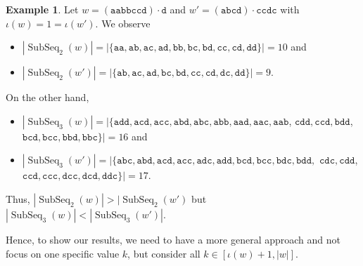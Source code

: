 \documentclass[10pt,a4paper]{amsart}
\def\ta{\mathtt{a}}
\def\tb{\mathtt{b}}
\def\tc{\mathtt{c}}
\def\td{\mathtt{d}}
\DeclareMathOperator{\alphabet}{alph}
\DeclareMathOperator\ScatFact{SubSeq}
\DeclareMathOperator\SubWords{SubSeq}
\DeclareMathOperator{\nextAlphPos}{next}
\theoremstyle{plain}
\theoremstyle{definition}
\newtheorem{example}{Example}
\begin{document}
\else
\begin{example}\label{counterexample}
    Let $w = \mathtt{(aabbccd) \cdot d}$ and $w' = \mathtt{(abcd) \cdot ccdc}$ with $\iota(w) = 1 = \iota(w')$. We observe
    \begin{itemize}
    \item $|\ScatFact_2(w)| = |\{\ta\ta, \ta\tb, \ta\tc, \ta\td, \tb\tb, \tb\tc, \tb\td, \tc\tc, \tc\td, \td\td\}| = 10$
    and
    \item $|\ScatFact_2(w')| = |\{\ta\tb, \ta\tc, \ta\td, \tb\tc, \tb\td, \tc\tc, \tc\td, \td\tc, \td\td\}| = 9$.
    \end{itemize}
    On the other hand, 
    \begin{itemize}
    \item $|\SubWords_3(w)|=|\{\ta\td\td,\ta\tc\td,\ta\tc\tc,
    \ta\tb\td,\ta\tb\tc,\ta\tb\tb,\ta\ta\td,\ta\ta\tc,\ta\ta\tb$, $\tc\td\td,\tc\tc\td,\tb\td\td$, $\tb\tc\td,\tb\tc\tc,\tb\tb\td, \tb\tb\tc\}| = 16$ and
    \item
    $|\ScatFact_3(w')| = |\{\ta\tb\tc,\ta\tb\td,\ta\tc\td,\ta\tc\tc,\ta\td\tc,\ta\td\td,\tb\tc\td,\tb\tc\tc,\tb\td\tc,\tb\td\td,$ 
    $\tc\td\tc,\tc\td\td$, $\tc\tc\td,\tc\tc\tc,\td\tc\tc,\td\tc\td,\td\td\tc\}| = 17$. 
    \end{itemize}
    Thus, $|\ScatFact_2(w)| > |\ScatFact_2(w')$ but $|\ScatFact_3(w)| < |\ScatFact_3(w')|$.
\end{example}

\fi
Hence, to show our results, we need to have a more general approach and not focus on one specific value $k$, but consider all $k\in[\iota(w)+1,|w|]$.
\end{document}
